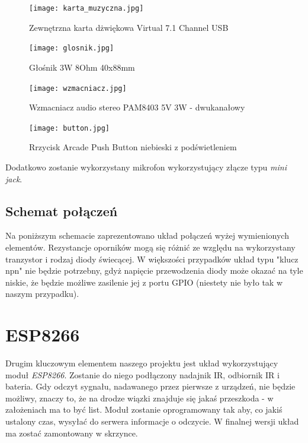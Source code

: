 	\begin{figure}[H]
	\centering
	\texttt{[image: karta\_muzyczna.jpg]}
	\caption{Zewnętrzna karta dżwiękowa Virtual 7.1 Channel USB }
	\end{figure}
	
	\begin{figure}[H]
	\centering
	\texttt{[image: glosnik.jpg]}
	\caption{Głośnik 3W 8Ohm 40x88mm}
	\end{figure}
	
	\begin{figure}[H]
	\centering
	\texttt{[image: wzmacniacz.jpg]}
	\caption{Wzmacniacz audio stereo PAM8403 5V 3W - dwukanałowy}
	\end{figure}
	
	\begin{figure}[H]
	\centering
	\texttt{[image: button.jpg]}
	\caption{Rrzycisk Arcade Push Button niebieski z podświetleniem}
	\end{figure}

Dodatkowo zostanie wykorzystany mikrofon wykorzystujący złącze typu \emph{mini jack}.

\subsection{Schemat połączeń}

Na poniższym schemacie zaprezentowano układ połączeń wyżej wymienionych elementów. Rezystancje oporników mogą się różnić ze względu na wykorzystany tranzystor i rodzaj diody świecącej. W większości przypadków układ typu "klucz npn" nie będzie potrzebny, gdyż napięcie przewodzenia diody może okazać na tyle niskie, że będzie możliwe zasilenie jej z portu GPIO (niestety nie było tak w naszym przypadku).

\begin{center}
\end{center}


\section{ESP8266}

Drugim kluczowym elementem naszego projektu jest układ wykorzystujący moduł \emph{ESP8266}. Zostanie do niego podłączony nadajnik IR, odbiornik IR i bateria. Gdy odczyt sygnału, nadawanego przez pierwsze z urządzeń, nie będzie możliwy, znaczy to, że na drodze wiązki znajduje się jakaś przeszkoda - w założeniach ma to być list. Moduł zostanie oprogramowany tak aby, co jakiś ustalony czas, wysyłać do serwera informacje o odczycie. W finalnej wersji układ ma zostać zamontowany w skrzynce.

